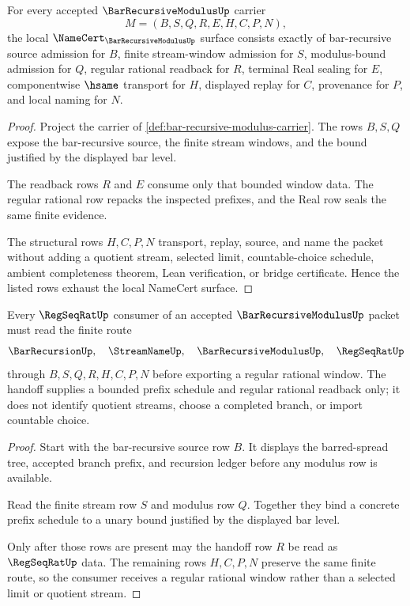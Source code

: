 \begin{theorem}
\label{thm:bar-recursive-modulus-namecert-obligations}
For every accepted $\BarRecursiveModulusUp$ carrier
$$
M=(B,S,Q,R,E,H,C,P,N),
$$
the local $\NameCert_{\BarRecursiveModulusUp}$ surface consists exactly of bar-recursive source admission for $B$, finite stream-window admission for $S$, modulus-bound admission for $Q$, regular rational readback for $R$, terminal Real sealing for $E$, componentwise $\hsame$ transport for $H$, displayed replay for $C$, provenance for $P$, and local naming for $N$.
\end{theorem}
\begin{proof}
Project the carrier of \autoref{def:bar-recursive-modulus-carrier}. The rows $B,S,Q$ expose the bar-recursive source, the finite stream windows, and the bound justified by the displayed bar level.

The readback rows $R$ and $E$ consume only that bounded window data. The regular rational row repacks the inspected prefixes, and the Real row seals the same finite evidence.

The structural rows $H,C,P,N$ transport, replay, source, and name the packet without adding a quotient stream, selected limit, countable-choice schedule, ambient completeness theorem, Lean verification, or bridge certificate. Hence the listed rows exhaust the local NameCert surface.
\end{proof}

\begin{theorem}
\label{thm:bar-recursive-modulus-regseqrat-handoff}
Every $\RegSeqRatUp$ consumer of an accepted $\BarRecursiveModulusUp$ packet must read the finite route
$$
\BarRecursionUp,\quad \StreamNameUp,\quad \BarRecursiveModulusUp,\quad \RegSeqRatUp
$$
through $B,S,Q,R,H,C,P,N$ before exporting a regular rational window. The handoff supplies a bounded prefix schedule and regular rational readback only; it does not identify quotient streams, choose a completed branch, or import countable choice.
\end{theorem}
\begin{proof}
Start with the bar-recursive source row $B$. It displays the barred-spread tree, accepted branch prefix, and recursion ledger before any modulus row is available.

Read the finite stream row $S$ and modulus row $Q$. Together they bind a concrete prefix schedule to a unary bound justified by the displayed bar level.

Only after those rows are present may the handoff row $R$ be read as $\RegSeqRatUp$ data. The remaining rows $H,C,P,N$ preserve the same finite route, so the consumer receives a regular rational window rather than a selected limit or quotient stream.
\end{proof}

